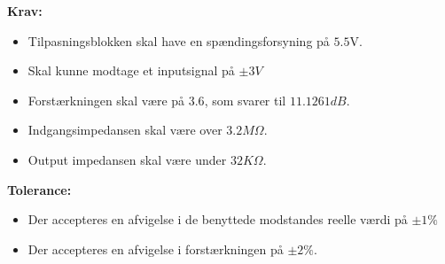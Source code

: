 \noindent\textbf{Krav:}
\begin{itemize}
	\item Tilpasningsblokken skal have en spændingsforsyning på $5.5$V.
	\item Skal kunne modtage et inputsignal på $\pm3V$
	\item Forstærkningen skal være på $3.6$, som svarer til $11.1261dB$.
	\item Indgangsimpedansen skal være over $3.2M\Omega$.
	\item Output impedansen skal være under $32K\Omega$.
\end{itemize}
\noindent\textbf{Tolerance:}
\begin{itemize}
	\item Der accepteres en afvigelse i de benyttede modstandes reelle værdi på $\pm1\%$
	\item Der accepteres en afvigelse i forstærkningen på $\pm2\%$.
\end{itemize}
